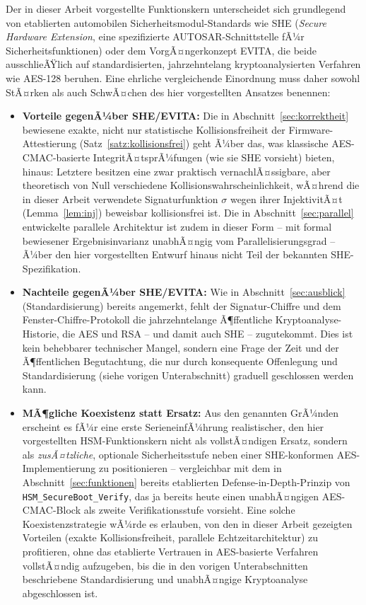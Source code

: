 ﻿\documentclass[a4paper,12pt]{article}
\theoremstyle{definition}
\begin{document}
Der in dieser Arbeit vorgestellte Funktionskern unterscheidet sich grundlegend von etablierten automobilen Sicherheitsmodul-Standards wie SHE (\emph{Secure Hardware Extension}, eine spezifizierte AUTOSAR-Schnittstelle fÃ¼r Sicherheitsfunktionen) oder dem VorgÃ¤ngerkonzept EVITA, die beide ausschlieÃŸlich auf standardisierten, jahrzehntelang kryptoanalysierten Verfahren wie AES-128 beruhen. Eine ehrliche vergleichende Einordnung muss daher sowohl StÃ¤rken als auch SchwÃ¤chen des hier vorgestellten Ansatzes benennen:

\begin{itemize}
	\item \textbf{Vorteile gegenÃ¼ber SHE/EVITA:} Die in Abschnitt~\ref{sec:korrektheit} bewiesene exakte, nicht nur statistische Kollisionsfreiheit der Firmware-Attestierung (Satz~\ref{satz:kollisionsfrei}) geht Ã¼ber das, was klassische AES-CMAC-basierte IntegritÃ¤tsprÃ¼fungen (wie sie SHE vorsieht) bieten, hinaus: Letztere besitzen eine zwar praktisch vernachlÃ¤ssigbare, aber theoretisch von Null verschiedene Kollisionswahrscheinlichkeit, wÃ¤hrend die in dieser Arbeit verwendete Signaturfunktion $\sigma$ wegen ihrer InjektivitÃ¤t (Lemma~\ref{lem:inj}) beweisbar kollisionsfrei ist. Die in Abschnitt~\ref{sec:parallel} entwickelte parallele Architektur ist zudem in dieser Form -- mit formal bewiesener Ergebnisinvarianz unabhÃ¤ngig vom Parallelisierungsgrad -- Ã¼ber den hier vorgestellten Entwurf hinaus nicht Teil der bekannten SHE-Spezifikation.
	\item \textbf{Nachteile gegenÃ¼ber SHE/EVITA:} Wie in Abschnitt~\ref{sec:ausblick} (Standardisierung) bereits angemerkt, fehlt der Signatur-Chiffre und dem Fenster-Chiffre-Protokoll die jahrzehntelange Ã¶ffentliche Kryptoanalyse-Historie, die AES und RSA -- und damit auch SHE -- zugutekommt. Dies ist kein behebbarer technischer Mangel, sondern eine Frage der Zeit und der Ã¶ffentlichen Begutachtung, die nur durch konsequente Offenlegung und Standardisierung (siehe vorigen Unterabschnitt) graduell geschlossen werden kann.
	\item \textbf{MÃ¶gliche Koexistenz statt Ersatz:} Aus den genannten GrÃ¼nden erscheint es fÃ¼r eine erste SerieneinfÃ¼hrung realistischer, den hier vorgestellten HSM-Funktionskern nicht als vollstÃ¤ndigen Ersatz, sondern als \emph{zusÃ¤tzliche}, optionale Sicherheitsstufe neben einer SHE-konformen AES-Implementierung zu positionieren -- vergleichbar mit dem in Abschnitt~\ref{sec:funktionen} bereits etablierten Defense-in-Depth-Prinzip von \texttt{HSM\_SecureBoot\_Verify}, das ja bereits heute einen unabhÃ¤ngigen AES-CMAC-Block als zweite Verifikationsstufe vorsieht. Eine solche Koexistenzstrategie wÃ¼rde es erlauben, von den in dieser Arbeit gezeigten Vorteilen (exakte Kollisionsfreiheit, parallele Echtzeitarchitektur) zu profitieren, ohne das etablierte Vertrauen in AES-basierte Verfahren vollstÃ¤ndig aufzugeben, bis die in den vorigen Unterabschnitten beschriebene Standardisierung und unabhÃ¤ngige Kryptoanalyse abgeschlossen ist.
\end{itemize}
\end{document}
